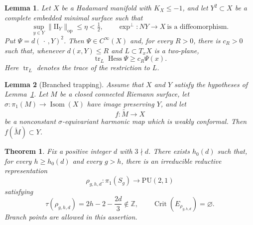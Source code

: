 \documentclass[10pt,a4paper]{amsart}
\newtheorem{theorem}{Theorem}
\newtheorem{lemma}{Lemma}
\newcommand{\Hess}{\operatorname{Hess}}
\newcommand{\II}{\mathrm{II}}
\newcommand{\PU}{\mathrm{PU}}
\newcommand{\tr}{\operatorname{tr}}
\begin{document}
\begin{lemma}\label{lem:tube}
Let $X$ be a Hadamard manifold with $K_X\le-1$, and let
$Y^2\subset X$ be a complete embedded minimal surface such that
\[
 \sup_{y\in Y}\|\II_Y\|_{\mathrm{op}}\le\eta<\tfrac12,
 \qquad
 \exp^\perp:NY\longrightarrow X\ \text{is a diffeomorphism}.
\]
Put $\Psi=d(\,\cdot\,,Y)^2$.  Then $\Psi\in C^\infty(X)$ and, for every
$R>0$, there is $c_R>0$ such that, whenever $d(x,Y)\le R$ and
$L\subset T_xX$ is a two-plane,
\begin{equation}\label{eq:tube-estimate}
 \tr_L\Hess\Psi\ge c_R\Psi(x).
\end{equation}
Here $\tr_L$ denotes the trace of the restriction to $L$.
\end{lemma}

\begin{lemma}[Branched trapping]\label{lem:trapping}
Assume that $X$ and $Y$ satisfy the hypotheses of Lemma~\ref{lem:tube}.  Let $M$
be a closed connected Riemann surface, let
$\sigma:\pi_1(M)\to\operatorname{Isom}(X)$ have image preserving $Y$, and let
\[
 f:\widetilde M\longrightarrow X
\]
be a nonconstant $\sigma$-equivariant harmonic map which is weakly conformal.
Then $f(\widetilde M)\subset Y$.
\end{lemma}

\begin{theorem}\label{thm:main}
Fix a positive integer $d$ with $3\nmid d$.  There exists $h_0(d)$ such that,
for every $h\ge h_0(d)$ and every $g>h$, there is an irreducible reductive
representation
\[
 \rho_{g,h,d}:\pi_1(S_g)\longrightarrow\PU(2,1)
\]
satisfying
\begin{equation}\label{eq:toledo-main}
 \tau(\rho_{g,h,d})=2h-2-\frac{2d}{3}\notin\mathbb Z,
 \qquad
 \operatorname{Crit}(E_{\rho_{g,h,d}})=\varnothing.
\end{equation}
Branch points are allowed in this assertion.
\end{theorem}
\end{document}
